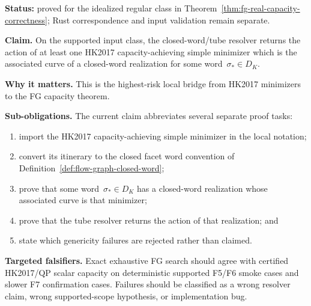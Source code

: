 \begin{unverified}
\begin{remark}%
\label{rem:fg-pr-resolver-completeness}
\textbf{Status:} proved for the idealized regular class in
Theorem~\ref{thm:fg-real-capacity-correctness}; Rust correspondence and input
validation remain separate.

\textbf{Claim.}  On the supported input class, the closed-word/tube resolver
returns the action of at least one HK2017 capacity-achieving simple minimizer
which is the associated curve of a closed-word realization for some
word~$\sigma_*\in D_K$.

\textbf{Why it matters.}  This is the highest-risk local bridge from HK2017
minimizers to the FG capacity theorem.

\textbf{Sub-obligations.}  The current claim abbreviates several separate
proof tasks:
\begin{enumerate}
  \item import the HK2017 capacity-achieving simple minimizer in the local
    notation;
  \item convert its itinerary to the closed facet word convention of
    Definition~\ref{def:flow-graph-closed-word};
  \item prove that some word~$\sigma_*\in D_K$ has a closed-word realization
    whose associated curve is that minimizer;
  \item prove that the tube resolver returns the action of that realization;
    and
  \item state which genericity failures are rejected rather than claimed.
\end{enumerate}

\textbf{Targeted falsifiers.}  Exact exhaustive FG search should agree with
certified HK2017/QP scalar capacity on deterministic supported F5/F6 smoke
cases and slower F7 confirmation cases.  Failures should be classified as a
wrong resolver claim, wrong supported-scope hypothesis, or implementation bug.
\end{remark}
\end{unverified}

